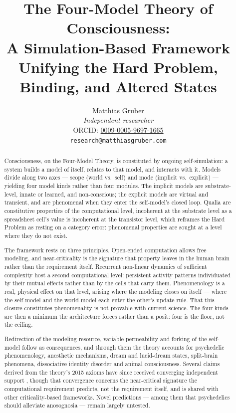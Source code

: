 \documentclass[12pt]{article}
\title{The Four-Model Theory of Consciousness:\\A Simulation-Based Framework Unifying the Hard Problem, Binding, and Altered States}
\author{Matthias Gruber\\
\textit{Independent researcher}\\
ORCID: \href{https://orcid.org/0009-0005-9697-1665}{0009-0005-9697-1665}\\
\texttt{research@matthiasgruber.com}}
\date{}
\begin{document}
\maketitle

\begin{abstract}\singlespacing
Consciousness, on the Four-Model Theory, is constituted by ongoing self-simulation: a system builds a model of itself, relates to that model, and interacts with it. Models divide along two axes --- scope (world vs.\ self) and mode (implicit vs.\ explicit) --- yielding four model kinds rather than four modules. The implicit models are substrate-level, innate or learned, and non-conscious; the explicit models are virtual and transient, and are phenomenal when they enter the self-model's closed loop. Qualia are constitutive properties of the computational level, incoherent at the substrate level as a spreadsheet cell's value is incoherent at the transistor level, which reframes the Hard Problem as resting on a category error: phenomenal properties are sought at a level where they do not exist.

The framework rests on three principles. Open-ended computation allows free modeling, and near-criticality is the signature that property leaves in the human brain rather than the requirement itself. Recurrent non-linear dynamics of sufficient complexity host a second computational level: persistent activity patterns individuated by their mutual effects rather than by the cells that carry them. Phenomenology is a real, physical effect on that level, arising where the modeling closes on itself --- where the self-model and the world-model each enter the other's update rule. That this closure constitutes phenomenality is not provable with current science. The four kinds are then a minimum the architecture forces rather than a posit: four is the floor, not the ceiling.

Redirection of the modeling resource, variable permeability and forking of the self-model follow as consequences, and through them the theory accounts for psychedelic phenomenology, anesthetic mechanisms, dream and lucid-dream states, split-brain phenomena, dissociative identity disorder and animal consciousness. Several claims derived from the theory's 2015 axioms have since received converging independent support \citep{Xu2024,HengenShew2025,AlgomShriki2026}, though that convergence concerns the near-critical signature the computational requirement predicts, not the requirement itself, and is shared with other criticality-based frameworks. Novel predictions --- among them that psychedelics should alleviate anosognosia --- remain largely untested.
\end{abstract}
\end{document}
